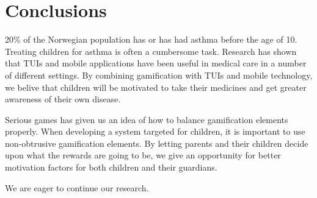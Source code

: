 \chapter{Conclusions}
\label{conclusions}

20\% of the Norwegian population has or has had asthma before the age of 10. Treating children for asthma is often a cumbersome task. Research has shown that TUIs and mobile applications have been useful in medical care in a number of different settings. By combining gamification with TUIs and mobile technology, we belive that children will be motivated to take their medicines and get greater awareness of their own disease.    


Serious games has given us an idea of how to balance gamification elements properly. When developing a system targeted for children, it is important to use non-obtrusive gamification elements. By letting parents and their children decide upon what the rewards are going to be, we give an opportunity for better motivation factors for both children and their guardians.   


We are eager to continue our research.


